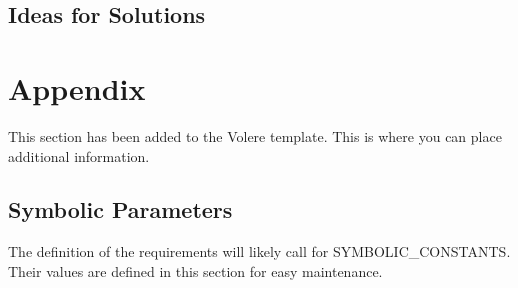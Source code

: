 \documentclass[12pt, titlepage]{article}
\begin{document}
	\subsection{Ideas for Solutions}

\newpage





\newpage

\section{Appendix}

This section has been added to the Volere template.  This is where you can place
additional information.

	\subsection{Symbolic Parameters}

	The definition of the requirements will likely call for SYMBOLIC\_CONSTANTS.
	Their values are defined in this section for easy maintenance.
\end{document}

